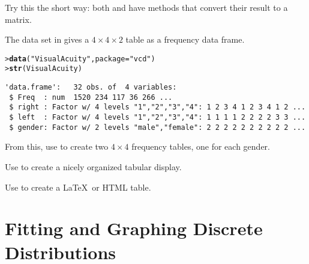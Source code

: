 \documentclass[11pt]{report}\usepackage[]{graphicx}\usepackage[]{color}
\makeatletter
\newcommand{\hlstr}[1]{\textcolor[rgb]{0.192,0.494,0.8}{#1}}%
\newcommand{\hlstd}[1]{\textcolor[rgb]{0.345,0.345,0.345}{#1}}%
\newcommand{\hlkwc}[1]{\textcolor[rgb]{0.333,0.667,0.333}{#1}}%
\newcommand{\hlkwd}[1]{\textcolor[rgb]{0.737,0.353,0.396}{\textbf{#1}}}%
\newenvironment{kframe}{%
 \def\at@end@of@kframe{}%
 \ifinner\ifhmode%
  \def\at@end@of@kframe{\end{minipage}}%
  \begin{minipage}{\columnwidth}%
 \fi\fi%
 \def\FrameCommand##1{\hskip\@totalleftmargin \hskip-\fboxsep
 \colorbox{shadecolor}{##1}\hskip-\fboxsep
     \hskip-\linewidth \hskip-\@totalleftmargin \hskip\columnwidth}%
 \MakeFramed {\advance\hsize-\width
   \@totalleftmargin\z@ \linewidth\hsize
   \@setminipage}}%
 {\par\unskip\endMakeFramed%
 \at@end@of@kframe}
\newenvironment{knitrout}{}{} %
\renewenvironment{knitrout}{\small\renewcommand{\baselinestretch}{.85}}{} %
\makeatother
\begin{document}
\begin{Exercises}
\begin{enumerate*}
    \item Try this the short way:  both  and  have 
    methods that convert their result to a matrix.
    \begin{ans}
    \end{ans}
    
  \end{enumerate*}

\exercise The data set  in  gives a $4 \times 4 \times 2$
table as a frequency data frame.
\begin{knitrout}
\color{fgcolor}\begin{kframe}
\begin{alltt}
\hlstd{> }\hlkwd{data}\hlstd{(}\hlstr{"VisualAcuity"}\hlstd{,} \hlkwc{package} \hlstd{=} \hlstr{"vcd"}\hlstd{)}
\hlstd{> }\hlkwd{str}\hlstd{(VisualAcuity)}
\end{alltt}
\begin{verbatim}
'data.frame':	32 obs. of  4 variables:
 $ Freq  : num  1520 234 117 36 266 ...
 $ right : Factor w/ 4 levels "1","2","3","4": 1 2 3 4 1 2 3 4 1 2 ...
 $ left  : Factor w/ 4 levels "1","2","3","4": 1 1 1 1 2 2 2 2 3 3 ...
 $ gender: Factor w/ 2 levels "male","female": 2 2 2 2 2 2 2 2 2 2 ...
\end{verbatim}
\end{kframe}
\end{knitrout}
  \begin{enumerate*}
    \item From this, use  to create two $4\times 4$ frequency tables, one for
each gender.
\begin{ans}
\end{ans}

    \item Use  to create a nicely organized tabular display.
    \begin{ans}
    \end{ans}
    
    \item Use  to create a \LaTeX\ or HTML table.
    \begin{ans}
    \end{ans}
    
  \end{enumerate*}

\end{Exercises}


\chapter{Fitting and Graphing Discrete Distributions}\label{ch:discrete}
\end{document}
